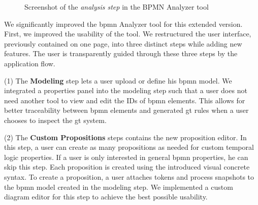 \documentclass{lmcs} %
\theoremstyle{plain}\newtheorem{satz}[thm]{Satz} %
\begin{document}
\begin{figure}[ht]
    \centering
    \caption{Screenshot of the \textit{analysis step} in the BPMN Analyzer tool}
    \label{fig:implScreenshot}
\end{figure}

We significantly improved the \gls*{bpmn} Analyzer tool for this extended version.
First, we improved the usability of the tool.
We restructured the user interface, previously contained on one page, into three distinct steps while adding new features.
The user is transparently guided through these three steps by the application flow.

(1) The \textbf{Modeling} step lets a user upload or define his \gls{bpmn} model.
We integrated a properties panel into the modeling step such that a user does not need another tool to view and edit the IDs of \gls*{bpmn} elements.
This allows for better traceability between \gls*{bpmn} elements and generated \gls*{gt} rules when a user chooses to inspect the \gls*{gt} system.

(2) The \textbf{Custom Propositions} steps contains the new proposition editor.
In this step, a user can create as many propositions as needed for custom temporal logic properties.
If a user is only interested in general \gls*{bpmn} properties, he can skip this step.
Each proposition is created using the introduced visual concrete syntax.
To create a proposition, a user attaches tokens and process snapshots to the \gls*{bpmn} model created in the modeling step.
We implemented a custom diagram editor for this step to achieve the best possible usability.
\end{document}
